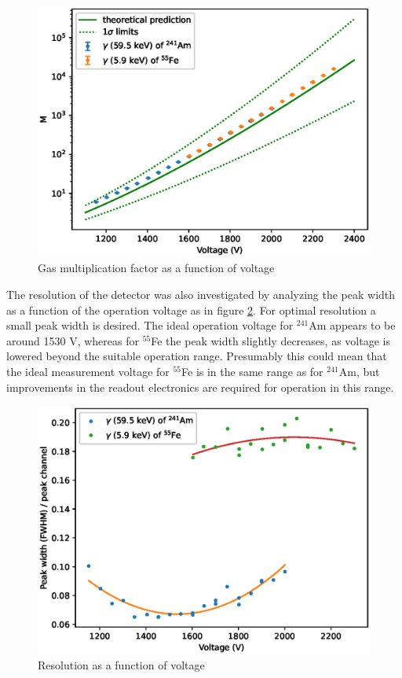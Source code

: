 \documentclass[a4paper]{article}
\begin{document}
\begin{figure}[ht!]
\centering
\includegraphics[width=\textwidth]{fig/python/gas_mult.eps}
\caption{Gas multiplication factor as a function of voltage}
\label{fig:gas_mult}
\end{figure}

\FloatBarrier
The resolution of the detector was also investigated by analyzing the peak width as a function of the operation voltage as in figure \ref{fig:resolution}.
For optimal resolution a small peak width is desired.
The ideal operation voltage for $^{241}$Am appears to be around 1530 V, whereas for $^{55}$Fe the peak width slightly decreases, as voltage is lowered beyond the suitable operation range.
Presumably this could mean that the ideal measurement voltage for $^{55}$Fe is in the same range as for $^{241}$Am, but improvements in the readout electronics are required for operation in this range.

\begin{figure}[ht!]
\centering
\includegraphics[width=\textwidth]{fig/python/resolution.eps}
\caption{Resolution as a function of voltage}
\label{fig:resolution}
\end{figure}
\end{document}
